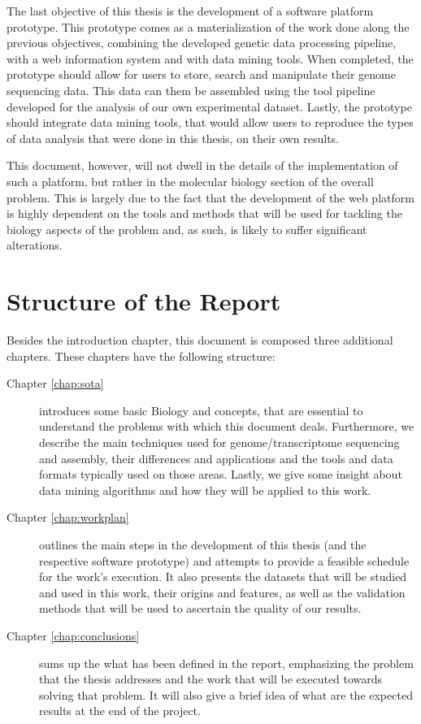 The last objective of this thesis is the development of a software platform
prototype. This prototype comes as a materialization of the work done along the
previous objectives, combining the developed genetic data processing pipeline,
with a web information system and with data mining tools. When completed, the
prototype should allow for users to store, search and manipulate their genome
sequencing data. This data can them be assembled using the tool pipeline
developed for the analysis of our own experimental dataset. Lastly, the
prototype should integrate data mining tools, that would allow users to
reproduce the types of data analysis that were done in this thesis, on their own
results.

This document, however, will not dwell in the details of the implementation of
such a platform, but rather in the molecular biology section of the overall
problem. This is largely due to the fact that the development of the web
platform is highly dependent on the tools and methods that will be used for
tackling the biology aspects of the problem and, as such, is likely to suffer
significant alterations.

\section{Structure of the Report} \label{sec:outline}

Besides the introduction chapter, this document is composed three additional
chapters. These chapters have the following structure:

\begin{description}

  \item[Chapter \ref{chap:sota}]
  introduces some basic Biology and \rnaseq{} concepts, that are essential to
  understand the problems with which this document deals. Furthermore, we
  describe the main techniques used for genome/transcriptome sequencing and
  assembly, their differences and applications and the tools and data formats
  typically used on those areas. Lastly, we give some insight about data mining
  algorithms and how they will be applied to this work.

  \item[Chapter \ref{chap:workplan}]
  outlines the main steps in the development of this thesis (and the respective
  software prototype) and attempts to provide a feasible schedule for the work's
  execution. It also presents the datasets that will be studied and used in this
  work, their origins and features, as well as the validation methods that will
  be used to ascertain the quality of our results.

  \item[Chapter \ref{chap:conclusions}]
  sums up the what has been defined in the report, emphasizing the problem that
  the thesis addresses and the work that will be executed towards solving that
  problem. It will also give a brief idea of what are the expected results at
  the end of the project.

\end{description}
